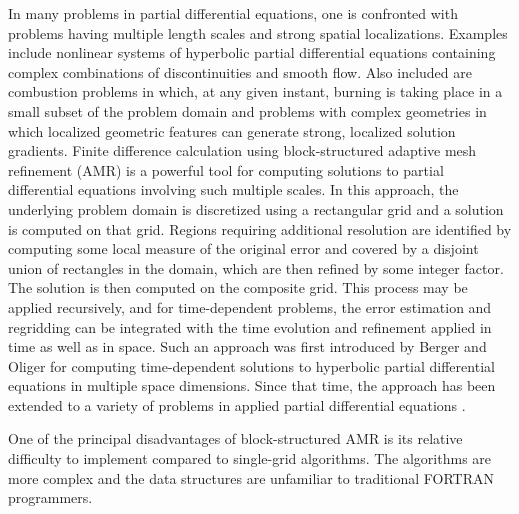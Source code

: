 
In many problems in partial differential equations, one is confronted
with problems having multiple length scales  and strong spatial
localizations.  Examples include nonlinear systems of hyperbolic partial
differential equations containing complex combinations of
discontinuities and smooth flow.   Also included are combustion 
problems in which, at any given instant, burning is taking place 
in a small subset of the problem domain and problems with complex
geometries in which localized geometric features can generate strong,
localized solution gradients.   Finite difference calculation
using block-structured adaptive mesh refinement (AMR) is a powerful
tool for computing solutions to partial differential equations
involving such multiple scales.  In this approach, the underlying
problem domain is discretized using a rectangular grid and a solution
is computed on that grid.  Regions requiring additional resolution are
identified by computing some local measure of the original error and
covered by a disjoint union of rectangles in the domain, which are
then refined by some integer factor.  The solution is then computed on
the composite grid.  This process may be applied recursively, and 
for time-dependent problems, the error estimation and regridding can
be integrated with the time evolution and refinement applied in time
as well as in space.
  Such an approach was first introduced by Berger and Oliger
\cite{bergerOliger:1984} for computing time-dependent solutions to
hyperbolic partial differential equations in multiple space
dimensions.  Since that time, the approach has been extended to a
variety of problems in applied partial differential equations
\cite{bergerColella:1989}
\cite{thompsonFerziger:1989}
\cite{bellBergerSaltzmanWelcome:1993} 
\cite{almgrenButtkeColella:1994}
\cite{pemberETAL:1995}
\cite{hornungTrangenstein:1997}
\cite{almgrenETAL:1998}
\cite{jesseeETAL:1998}
\cite{pemberETAL:1998}
\cite{howellETAL:1999}
\cite{colellaDorrWake:1999b}
.

One of the principal disadvantages of block-structured AMR is its
relative difficulty to implement  compared to single-grid algorithms.
The algorithms are more complex and the data structures are unfamiliar
to traditional FORTRAN programmers.  

